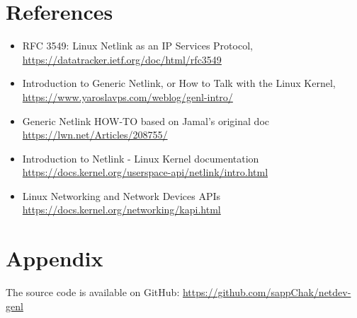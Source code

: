 \documentclass[10pt, letterpaper]{article}
\begin{document}
\section{References}
\begin{itemize}
	\item RFC 3549: Linux Netlink as an IP Services Protocol, \url{https://datatracker.ietf.org/doc/html/rfc3549}
	\item Introduction to Generic Netlink, or How to Talk with the Linux Kernel, \url{https://www.yaroslavps.com/weblog/genl-intro/}
	\item Generic Netlink HOW-TO based on Jamal's original doc \url{https://lwn.net/Articles/208755/}
	\item Introduction to Netlink - Linux Kernel documentation \url{https://docs.kernel.org/userspace-api/netlink/intro.html}
	\item Linux Networking and Network Devices APIs \url{https://docs.kernel.org/networking/kapi.html}
\end{itemize}

\section*{Appendix}
The source code is available on GitHub: \url{https://github.com/sappChak/netdev-genl}
\end{document}
